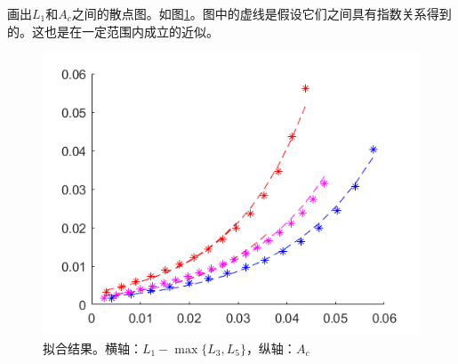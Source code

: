 \documentclass[12pt,a4paper]{article}
\begin{document}
画出$L_1$和$A_c$之间的散点图。如图\ref{fn1}。图中的虚线是假设它们之间具有指数关系得到的。这也是在一定范围内成立的近似。
\begin{figure}[h]
\centering
\includegraphics[width=0.4\linewidth]{n1ac}
\caption{拟合结果。横轴：$L_1 - \max\{L_3, L_5\}$，纵轴：$A_c$}
\label{fn1}
\end{figure}


%
\end{document}

